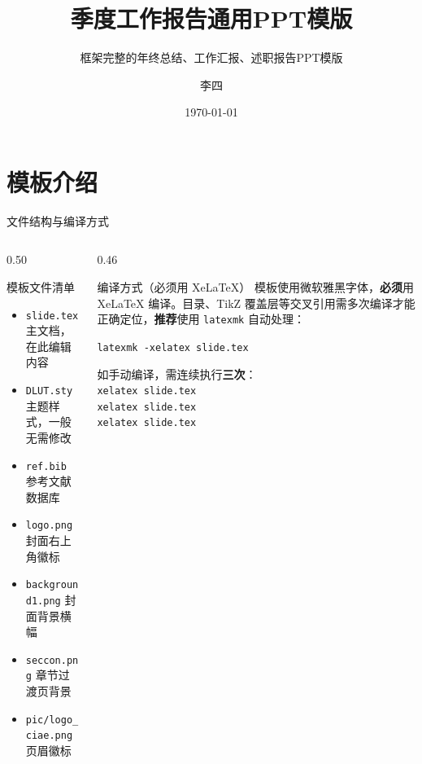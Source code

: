\documentclass[aspectratio=169]{beamer}
\author[李四]{李四}
\title{季度工作报告通用PPT模版}
\subtitle{框架完整的年终总结、工作汇报、述职报告PPT模版}
\institute[核物理基础研究室]{核物理基础研究室}
\date{\today}
\begin{document}
\begin{frame}[plain]
    \titlepage
\end{frame}

\maketotalcontents

\section{模板介绍}

\begin{frame}{文件结构与编译方式}
\begin{columns}[T]
\begin{column}{0.50\textwidth}
\begin{aim*}{模板文件清单}{}
\begin{itemize}[left=0pt,label=\textcolor{deepblue}{}]
    \item \texttt{slide.tex} \enspace 主文档，在此编辑内容
    \item \texttt{DLUT.sty} \enspace 主题样式，一般无需修改
    \item \texttt{ref.bib} \enspace 参考文献数据库
    \item \texttt{logo.png} \enspace 封面右上角徽标
    \item \texttt{background1.png} \enspace 封面背景横幅
    \item \texttt{seccon.png} \enspace 章节过渡页背景
    \item \texttt{pic/logo\_ciae.png} \enspace 页眉徽标
\end{itemize}
\end{aim*}
\end{column}
\begin{column}{0.46\textwidth}
\begin{aim*}{编译方式（必须用 XeLaTeX）}{}
模板使用微软雅黑字体，\textbf{必须}用 XeLaTeX 编译。目录、TikZ 覆盖层等交叉引用需多次编译才能正确定位，\textbf{推荐}使用 \texttt{latexmk} 自动处理：
\medskip

\texttt{\small latexmk -xelatex slide.tex}
\medskip

如手动编译，需连续执行\textbf{三次}：\\[0.2em]
\texttt{\small xelatex slide.tex}\\[0.2em]
\texttt{\small xelatex slide.tex}\\[0.2em]
\texttt{\small xelatex slide.tex}
\end{aim*}
\end{column}
\end{columns}
\end{frame}
\end{document}
